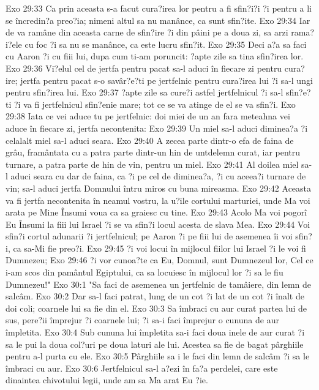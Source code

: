 Exo 29:33  Ca prin aceasta s-a facut cura?irea lor pentru a fi sfin?i?i ?i pentru a li se încredin?a preo?ia; nimeni altul sa nu manânce, ca sunt sfin?ite.
Exo 29:34  Iar de va ramâne din aceasta carne de sfin?ire ?i din pâini pe a doua zi, sa arzi rama?i?ele cu foc ?i sa nu se manânce, ca este lucru sfin?it.
Exo 29:35  Deci a?a sa faci cu Aaron ?i cu fiii lui, dupa cum ti-am poruncit: ?apte zile sa tina sfin?irea lor.
Exo 29:36  Vi?elul cel de jertfa pentru pacat sa-l aduci în fiecare zi pentru cura?ire; jertfa pentru pacat s-o savâr?e?ti pe jertfelnic pentru cura?irea lui ?i sa-l ungi pentru sfin?irea lui.
Exo 29:37  ?apte zile sa cure?i astfel jertfelnicul ?i sa-l sfin?e?ti ?i va fi jertfelnicul sfin?enie mare; tot ce se va atinge de el se va sfin?i.
Exo 29:38  Iata ce vei aduce tu pe jertfelnic: doi miei de un an fara meteahna vei aduce în fiecare zi, jertfa necontenita:
Exo 29:39  Un miel sa-l aduci diminea?a ?i celalalt miel sa-l aduci seara.
Exo 29:40  A zecea parte dintr-o efa de faina de grâu, framântata cu a patra parte dintr-un hin de untdelemn curat, iar pentru turnare, a patra parte de hin de vin, pentru un miel.
Exo 29:41  Al doilea miel sa-l aduci seara cu dar de faina, ca ?i pe cel de diminea?a, ?i cu aceea?i turnare de vin; sa-l aduci jertfa Domnului întru miros cu buna mireasma.
Exo 29:42  Aceasta va fi jertfa necontenita în neamul vostru, la u?ile cortului marturiei, unde Ma voi arata pe Mine Însumi voua ca sa graiesc cu tine.
Exo 29:43  Acolo Ma voi pogorî Eu Însumi la fiii lui Israel ?i se va sfin?i locul acesta de slava Mea.
Exo 29:44  Voi sfin?i cortul adunarii ?i jertfelnicul; pe Aaron ?i pe fiii lui de asemenea îi voi sfin?i, ca sa-Mi fie preo?i.
Exo 29:45  ?i voi locui în mijlocul fiilor lui Israel ?i le voi fi Dumnezeu;
Exo 29:46  ?i vor cunoa?te ca Eu, Domnul, sunt Dumnezeul lor, Cel ce i-am scos din pamântul Egiptului, ca sa locuiesc în mijlocul lor ?i sa le fiu Dumnezeu!"
Exo 30:1  "Sa faci de asemenea un jertfelnic de tamâiere, din lemn de salcâm.
Exo 30:2  Dar sa-l faci patrat, lung de un cot ?i lat de un cot ?i înalt de doi coli; coarnele lui sa fie din el.
Exo 30:3  Sa îmbraci cu aur curat partea lui de sus, pere?ii împrejur ?i coarnele lui; ?i sa-i faci împrejur o cununa de aur împletita.
Exo 30:4  Sub cununa lui împletita sa-i faci doua inele de aur curat ?i sa le pui la doua col?uri pe doua laturi ale lui. Acestea sa fie de bagat pârghiile pentru a-l purta cu ele.
Exo 30:5  Pârghiile sa i le faci din lemn de salcâm ?i sa le îmbraci cu aur.
Exo 30:6  Jertfelnicul sa-l a?ezi în fa?a perdelei, care este dinaintea chivotului legii, unde am sa Ma arat Eu ?ie.
